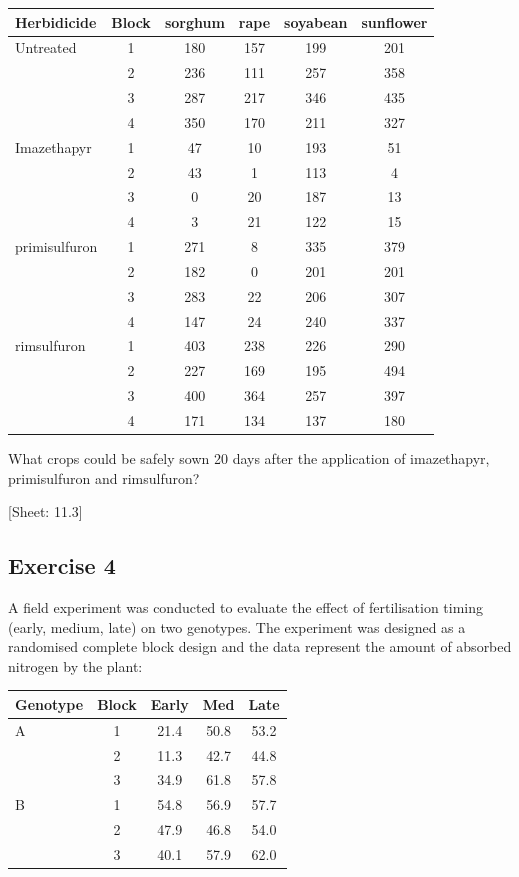\documentclass[a4paper,12pt,oneside]{book}
\begin{document}
\begin{longtable}[]{@{}lccccc@{}}
\toprule()
Herbidicide & Block & sorghum & rape & soyabean & sunflower \\
\midrule()
\endhead
Untreated & 1 & 180 & 157 & 199 & 201 \\
& 2 & 236 & 111 & 257 & 358 \\
& 3 & 287 & 217 & 346 & 435 \\
& 4 & 350 & 170 & 211 & 327 \\
Imazethapyr & 1 & 47 & 10 & 193 & 51 \\
& 2 & 43 & 1 & 113 & 4 \\
& 3 & 0 & 20 & 187 & 13 \\
& 4 & 3 & 21 & 122 & 15 \\
primisulfuron & 1 & 271 & 8 & 335 & 379 \\
& 2 & 182 & 0 & 201 & 201 \\
& 3 & 283 & 22 & 206 & 307 \\
& 4 & 147 & 24 & 240 & 337 \\
rimsulfuron & 1 & 403 & 238 & 226 & 290 \\
& 2 & 227 & 169 & 195 & 494 \\
& 3 & 400 & 364 & 257 & 397 \\
& 4 & 171 & 134 & 137 & 180 \\
\bottomrule()
\end{longtable}

What crops could be safely sown 20 days after the application of imazethapyr, primisulfuron and rimsulfuron?

{[}Sheet: 11.3{]}

\hypertarget{exercise-4-4}{%
\subsection{Exercise 4}\label{exercise-4-4}}

A field experiment was conducted to evaluate the effect of fertilisation timing (early, medium, late) on two genotypes. The experiment was designed as a randomised complete block design and the data represent the amount of absorbed nitrogen by the plant:

\begin{longtable}[]{@{}lcccc@{}}
\toprule()
Genotype & Block & Early & Med & Late \\
\midrule()
\endhead
A & 1 & 21.4 & 50.8 & 53.2 \\
& 2 & 11.3 & 42.7 & 44.8 \\
& 3 & 34.9 & 61.8 & 57.8 \\
B & 1 & 54.8 & 56.9 & 57.7 \\
& 2 & 47.9 & 46.8 & 54.0 \\
& 3 & 40.1 & 57.9 & 62.0 \\
\bottomrule()
\end{longtable}
\end{document}
